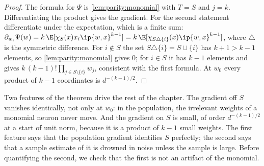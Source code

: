 \begin{refsection}
\begin{proof}
The formula for $\Psi$ is \cref{lem:parity:monomial} with $T=S$ and $j=k$. Differentiating the product gives the gradient. For the second statement differentiate under the expectation, which is a finite sum: $\partial_{w_i}\Psi(w)=k\,\E[\chi_S(x)x_i\ip{w,x}^{k-1}]=k\,\E[\chi_{S\triangle\{i\}}(x)\ip{w,x}^{k-1}]$, where $\triangle$ is the symmetric difference. For $i\notin S$ the set $S\triangle\{i\}=S\cup\{i\}$ has $k+1>k-1$ elements, so \cref{lem:parity:monomial} gives $0$; for $i\in S$ it has $k-1$ elements and gives $k\,(k-1)!\prod_{j\in S\setminus\{i\}}w_j$, consistent with the first formula. At $w_0$ every product of $k-1$ coordinates is $d^{-(k-1)/2}$.
\end{proof}

Two features of the theorem drive the rest of the chapter. The gradient off $S$ vanishes identically, not only at $w_0$: in the population, the irrelevant weights of a monomial neuron never move. And the gradient on $S$ is small, of order $d^{-(k-1)/2}$ at a start of unit norm, because it is a product of $k-1$ small weights. The first feature says that the population gradient identifies $S$ perfectly; the second says that a sample estimate of it is drowned in noise unless the sample is large. Before quantifying the second, we check that the first is not an artifact of the monomial.



\end{refsection}
